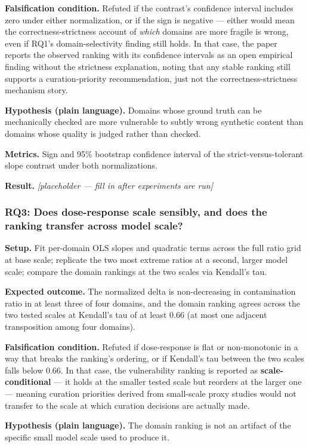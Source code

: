 \documentclass[11pt]{article}
\newcommand{\ph}{\textit{[placeholder --- fill in after experiments are run]}}
\begin{document}
\textbf{Falsification condition.} Refuted if the contrast's confidence interval includes zero under either normalization, or if the sign is negative --- either would mean the correctness-strictness account of \emph{which} domains are more fragile is wrong, even if RQ1's domain-selectivity finding still holds. In that case, the paper reports the observed ranking with its confidence intervals as an open empirical finding without the strictness explanation, noting that any stable ranking still supports a curation-priority recommendation, just not the correctness-strictness mechanism story.

\textbf{Hypothesis (plain language).} Domains whose ground truth can be mechanically checked are more vulnerable to subtly wrong synthetic content than domains whose quality is judged rather than checked.

\textbf{Metrics.} Sign and 95\% bootstrap confidence interval of the strict-versus-tolerant slope contrast under both normalizations.

\textbf{Result.} \ph

\subsubsection{RQ3: Does dose-response scale sensibly, and does the ranking transfer across model scale?}
\textbf{Setup.} Fit per-domain OLS slopes and quadratic terms across the full ratio grid at base scale; replicate the two most extreme ratios at a second, larger model scale; compare the domain rankings at the two scales via Kendall's tau.

\textbf{Expected outcome.} The normalized delta is non-decreasing in contamination ratio in at least three of four domains, and the domain ranking agrees across the two tested scales at Kendall's tau of at least 0.66 (at most one adjacent transposition among four domains).

\textbf{Falsification condition.} Refuted if dose-response is flat or non-monotonic in a way that breaks the ranking's ordering, or if Kendall's tau between the two scales falls below 0.66. In that case, the vulnerability ranking is reported as \textbf{scale-conditional} --- it holds at the smaller tested scale but reorders at the larger one --- meaning curation priorities derived from small-scale proxy studies would not transfer to the scale at which curation decisions are actually made.

\textbf{Hypothesis (plain language).} The domain ranking is not an artifact of the specific small model scale used to produce it.
\end{document}
